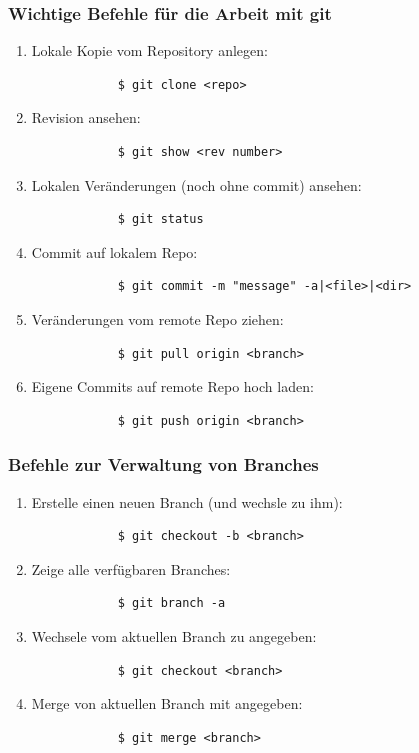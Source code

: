 \documentclass[ucs,9pt]{beamer}
\begin{document}
  \begin{frame}[fragile]
    \frametitle{Wichtige Befehle für die Arbeit mit git}
    \begin{enumerate}
        \item Lokale Kopie vom Repository anlegen:
            \begin{verbatim}
            $ git clone <repo>
            \end{verbatim}
        \item Revision ansehen:
            \begin{verbatim}
            $ git show <rev number>
            \end{verbatim}
        \item Lokalen Veränderungen (noch ohne commit) ansehen:
            \begin{verbatim}
            $ git status
            \end{verbatim}
        \item Commit auf lokalem Repo:
            \begin{verbatim}
            $ git commit -m "message" -a|<file>|<dir>
            \end{verbatim}
        \item Veränderungen vom remote Repo ziehen:
            \begin{verbatim}
            $ git pull origin <branch>
            \end{verbatim}
        \item Eigene Commits auf remote Repo hoch laden:
            \begin{verbatim}
            $ git push origin <branch>
            \end{verbatim}
    \end{enumerate}
\end{frame}

\begin{frame}[fragile]
    \frametitle{Befehle zur Verwaltung von Branches}
    \begin{enumerate}
        \item Erstelle einen neuen Branch (und wechsle zu ihm):
            \begin{verbatim}
            $ git checkout -b <branch>
            \end{verbatim}
        \item Zeige alle verfügbaren Branches:
            \begin{verbatim}
            $ git branch -a
            \end{verbatim}
        \item Wechsele vom aktuellen Branch zu angegeben:
            \begin{verbatim}
            $ git checkout <branch>
            \end{verbatim}
        \item Merge von aktuellen Branch mit angegeben:
            \begin{verbatim}
            $ git merge <branch>
            \end{verbatim}
    \end{enumerate}
\end{frame}
\end{document}
